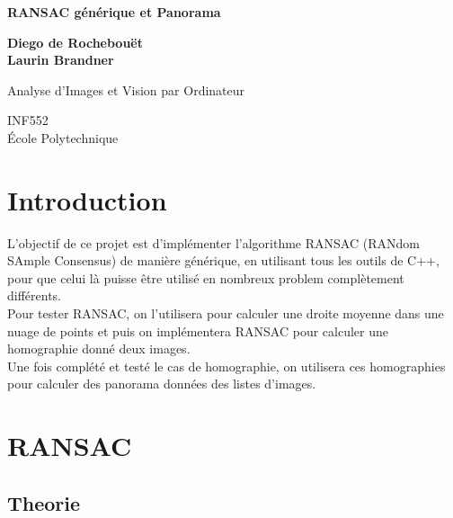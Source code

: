 \documentclass[11pt]{article}
\begin{document}
\begin{titlepage}
    \begin{center}
        \vspace*{1cm}
        
        \Huge
        \textbf{RANSAC générique et Panorama}
        
        \vspace{0.5cm}
        
        \vspace{1.5cm}
        
        \textbf{Diego de Rochebouët} \\
        \textbf{Laurin Brandner}
        
        \vfill
        
        \Large
        Analyse d'Images et Vision par Ordinateur
        
        \vspace{0.8cm}
        
        \Large
        INF552\\
        École Polytechnique\\
        
    \end{center}
\end{titlepage}

\section{Introduction}

L’objectif de ce projet est d'implémenter l'algorithme RANSAC (RANdom SAmple Consensus) de manière générique, en utilisant tous les outils de C++, pour que celui là puisse être utilisé en nombreux problem complètement différents. \\
Pour tester RANSAC, on l’utilisera pour calculer une droite moyenne dans une nuage de points et puis on implémentera RANSAC pour calculer une homographie donné deux images. \\
Une fois complété et testé le cas de homographie, on utilisera ces homographies pour calculer des panorama données des listes d’images.

\section{RANSAC}

\subsection{Theorie}
\end{document}
